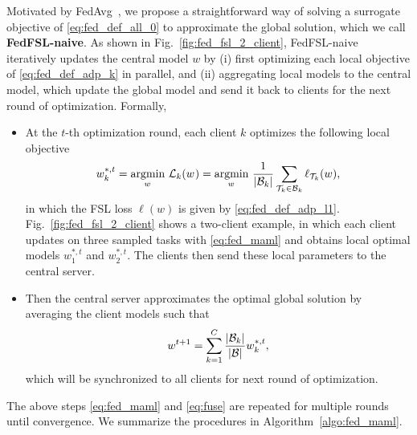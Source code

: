 Motivated by FedAvg~\cite{fedavg}, we propose a straightforward way of solving a surrogate objective of \eqref{eq:fed_def_all_0} to approximate the global solution, which we call \textbf{FedFSL-naive}.
As shown in Fig.~\ref{fig:fed_fsl_2_client},
FedFSL-naive iteratively updates the central model $w$ by (i) first optimizing each local objective of \eqref{eq:fed_def_adp_k} in parallel, and (ii) aggregating local models to the central model, which update the global model and send it back to clients for the next round of optimization. Formally,
\begin{itemize}[leftmargin=*]
\item At the $t$-th optimization round, each client $k$ optimizes the following local objective
\begin{equation}
\begin{split}
w^{*,t}_k &= \underset{\wsupsubeq{}{}}{\text{argmin}} \ \mathcal{L}_k(\wsupsubeq{}{}) = \underset{\wsupsubeq{}{}}{\text{argmin}} \ \frac{1}{|\mathcal{B}_k|} \sum_{\Tcaleq_k \in \mathcal{B}_k} \ell_{\Tcaleq_k} (w), \\
\end{split}
\label{eq:fed_maml}
\end{equation}
in which the FSL loss $\ell(w)$ is given by \eqref{eq:fed_def_adp_l1}. Fig.~\ref{fig:fed_fsl_2_client} shows a two-client example, in which each client updates on three sampled tasks with \eqref{eq:fed_maml} and obtains local optimal models $w^{*,t}_1$ and $w^{*,t}_2$. The clients then send these local parameters to the central server. 
\item Then the central server approximates the optimal global solution by averaging the client models such that
\begin{equation}
\label{eq:fuse}
w^{t+1} = \sum_{k=1}^C  \frac{|\mathcal{B}_k|}{|\mathcal{B}|} w^{*,t}_{k},
\end{equation}
which will be synchronized to all clients for next round of optimization.
\end{itemize}
The above steps \eqref{eq:fed_maml} and \eqref{eq:fuse} are repeated for multiple rounds until convergence. We summarize the procedures in Algorithm~\ref{algo:fed_maml}.



